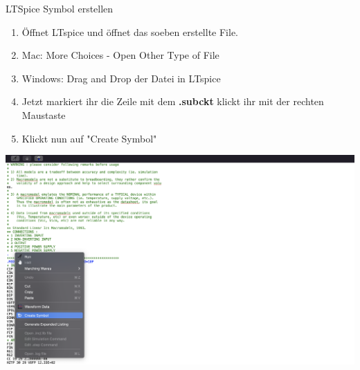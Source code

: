 \begin{frame}[t]{LTSpice Symbol erstellen} 

    \begin{enumerate}
        \item Öffnet LTspice und öffnet das soeben erstellte File. 
        \item Mac: More Choices -\> Open Other Type of File
        \item Windows: Drag and Drop der Datei in LTspice
        \item Jetzt markiert ihr die Zeile mit dem \textbf{.subckt} klickt ihr mit der rechten Maustaste
        \item Klickt nun auf "Create Symbol"
    \end{enumerate}


    \begin{spacing}{0.9} \begin{tiny}
        \begin{minipage}{\textwidth}
          \includegraphics[width=0.6\linewidth]{pictures/ModelCreation.png}
        \end{minipage}
    \end{tiny} \end{spacing}

\end{frame}


